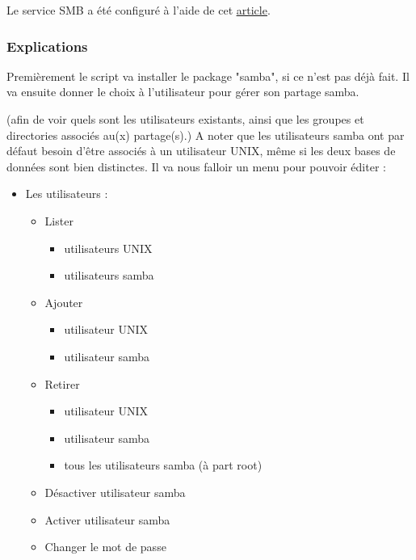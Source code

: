 \documentclass{article}
\begin{document}
Le service SMB a été configuré à l'aide de cet \href{https://docs.fedoraproject.org/en-US/quick-docs/samba/}{\underline{article}}.
	
	\subsubsection{Explications}

	Premièrement le script va installer le package "samba", si ce n'est pas déjà fait.
	Il va ensuite donner le choix à l'utilisateur pour gérer son partage samba.
	 
	(afin de voir quels sont les utilisateurs existants, ainsi que les groupes et directories associés au(x) partage(s).)
	A noter que les utilisateurs samba ont par défaut besoin d'être associés à un utilisateur UNIX, même si les deux bases de données sont bien distinctes.
	Il va nous falloir un menu pour pouvoir éditer :
	\begin{itemize}
		\item Les utilisateurs :
		\begin{itemize}
			\item[\checkmark] Lister  
			\begin{itemize}
				\item[\checkmark] utilisateurs UNIX
				\item[\checkmark] utilisateurs samba
			\end{itemize}
			\item[\checkmark] Ajouter 
			\begin{itemize}
					\item[\checkmark] utilisateur UNIX
				\item[\checkmark] utilisateur samba 
			\end{itemize}
			\item Retirer
						\begin{itemize}
				\item utilisateur UNIX
				\item[\checkmark] utilisateur samba 
				\item [\checkmark] tous les utilisateurs samba (à part root)
			\end{itemize}
			\item Désactiver utilisateur samba
			\item Activer utilisateur samba
			\item Changer le mot de passe
		\end{itemize}	
	\end{itemize}
\end{document}
